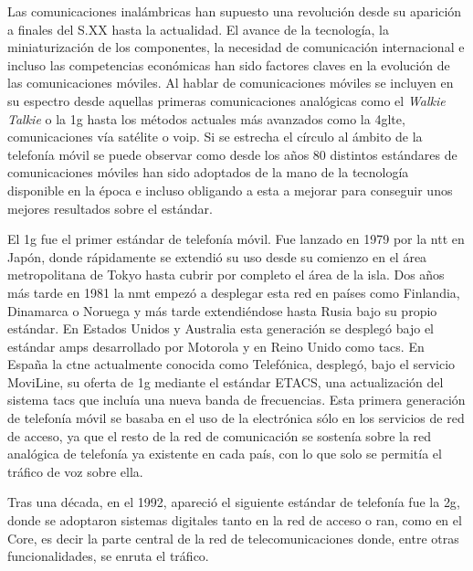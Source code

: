 \par Las comunicaciones inalámbricas han supuesto una revolución desde su aparición a finales del S.XX hasta la actualidad. El avance de la tecnología, la miniaturización de los componentes, la necesidad de comunicación internacional e incluso las competencias económicas han sido factores claves en la evolución de las comunicaciones móviles. Al hablar de comunicaciones móviles se incluyen en su espectro desde aquellas primeras comunicaciones analógicas como el \textit{Walkie Talkie} o la \gls{1g} hasta los métodos actuales más avanzados como la \gls{4glte}, comunicaciones vía satélite o \gls{voip}. Si se estrecha el círculo al ámbito de la telefonía móvil se puede observar como desde los años 80 distintos estándares de comunicaciones móviles han sido adoptados de la mano de la tecnología disponible en la época e incluso obligando a esta a mejorar para conseguir unos mejores resultados sobre el estándar. 
\\
\par El \gls{1g} fue el primer estándar de telefonía móvil. Fue lanzado en 1979 por la \gls{ntt} en Japón, donde rápidamente se extendió su uso desde su comienzo en el área metropolitana de Tokyo hasta cubrir por completo el área de la isla. Dos años más tarde en 1981 la \gls{nmt} empezó a desplegar esta red en países como Finlandia, Dinamarca o Noruega y más tarde extendiéndose hasta Rusia bajo su propio estándar. En Estados Unidos y Australia esta generación se desplegó bajo el estándar \gls{amps} desarrollado por Motorola y en Reino Unido como \gls{tacs}. En España la \gls{ctne} actualmente conocida como Telefónica, desplegó, bajo el servicio MoviLine, su oferta de \gls{1g} mediante el estándar ETACS, una actualización del sistema \gls{tacs} que incluía una nueva banda de frecuencias. Esta primera generación de telefonía móvil se basaba en el uso de la electrónica sólo en los servicios de red de acceso, ya que el resto de la red de comunicación se sostenía sobre la red analógica de telefonía ya existente en cada país, con lo que solo se permitía el tráfico de voz sobre ella.
\\
\par Tras una década, en el 1992, apareció el siguiente estándar de telefonía fue la \gls{2g}, donde se adoptaron sistemas digitales tanto en la red de acceso o \gls{ran}, como en el Core, es decir la parte central de la red de telecomunicaciones donde, entre otras funcionalidades, se enruta el tráfico.
